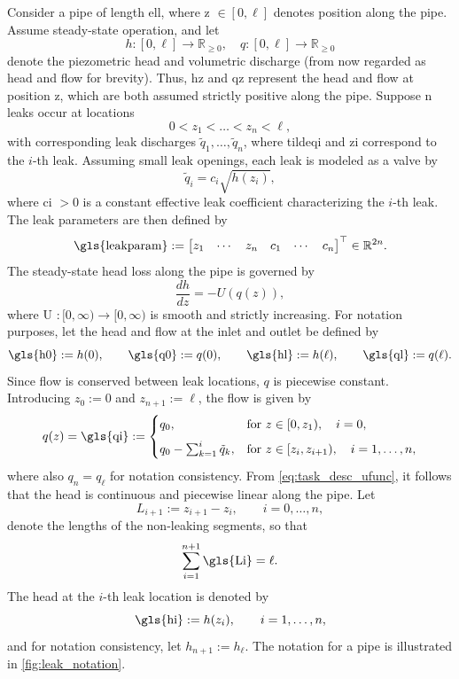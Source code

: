 
Consider a pipe of length \gls{ell}, where \gls{z} $\in [0, \ell]$ denotes position along the pipe. Assume steady-state operation, and let
\[
h : [0,\ell] \to \mathbb{R}_{\geq0}, \quad q : [0,\ell] \to \mathbb{R}_{\geq0}
\]
denote the piezometric head and volumetric discharge (from now regarded as head and flow for brevity). Thus, \gls{hz} and \gls{qz} represent the head and flow at position \gls{z}, which are both assumed strictly positive along the pipe. Suppose \gls{n} leaks occur at locations
\[
0 < z_1 < \dots < z_n < \ell,
\]
with corresponding leak discharges $\tilde q_1,\dots,\tilde q_n$, where \gls{tildeqi} and \gls{zi} correspond to the $i$-th leak. Assuming small leak openings, each leak is modeled as a valve by
\[
\tilde{q}_i = c_i \sqrt{h(z_i)},
\]
where \gls{ci} $>0$ is a constant effective leak coefficient characterizing the $i$-th leak. The leak parameters are then defined by
\begin{equation*}
    \text{\gls{leakparam}} := \begin{bmatrix}
    z_1 & \cdots & z_n & c_1 & \cdots & c_n
\end{bmatrix}^\top \in \mathbb{R}^{2n}.
\end{equation*}
The steady-state head loss along the pipe is governed by
\begin{equation}
\label{eq:task_desc_ufunc}
\frac{dh}{dz} = -U(q(z)),
\end{equation}
where \gls{U} $:[0,\infty)\to[0,\infty)$ is smooth and strictly increasing. For notation purposes, let the head and flow at the inlet and outlet be defined by
\[
\text{\gls{h0}} := h(0), \qquad \text{\gls{q0}} := q(0), \qquad
\text{\gls{hl}} := h(\ell), \qquad \text{\gls{ql}} := q(\ell).
\]
Since flow is conserved between leak locations, $q$ is piecewise constant. Introducing $z_0:=0$ and $z_{n+1}:=\ell$, the flow is given by
\[
q(z)=\text{\gls{qi}}:=
\begin{cases}
q_0, & \text{for } z \in [0, z_1), \quad i = 0, \\[6pt]
q_0 - \sum_{k=1}^{i} \tilde{q}_k, & \text{for } z \in [z_i, z_{i+1}), \quad i = 1, \dots, n,
\end{cases}
\]
where also $q_n=q_{\ell}$ for notation consistency. From \cref{eq:task_desc_ufunc}, it follows that the head is continuous and piecewise linear along the pipe. Let
\[
L_{i+1} := z_{i+1}-z_{i},
\qquad i=0,\dots,n,
\]
denote the lengths of the non-leaking segments, so that
\[
\sum_{i=1}^{n+1} \text{\gls{Li}} = \ell.
\]
The head at the $i$-th leak location is denoted by
\[
\text{\gls{hi}} := h(z_i), \qquad i=1,\dots,n,
\]
and for notation consistency, let $h_{n+1}:=h_{\ell}$. The notation for a pipe is illustrated in \autoref{fig:leak_notation}.\\

